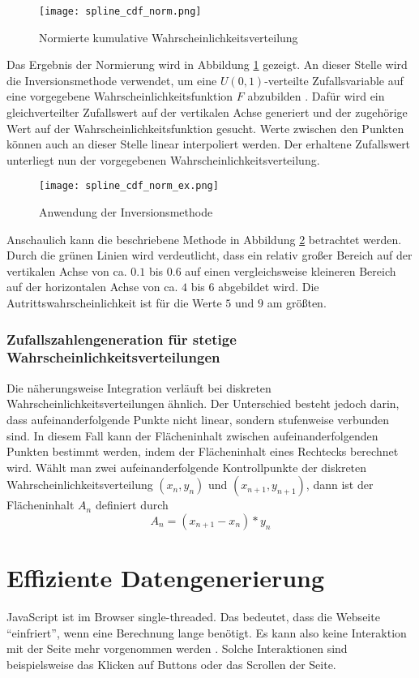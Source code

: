 \begin{figure}[H]
    \centering
    \texttt{[image: spline\_cdf\_norm.png]}
    \caption{Normierte kumulative Wahrscheinlichkeitsverteilung}\label{fig:cdfnorm}
\end{figure}

Das Ergebnis der Normierung wird in Abbildung \ref{fig:cdfnorm} gezeigt.
An dieser Stelle wird die Inversionsmethode verwendet, um eine $U(0,1)$-verteilte Zufallsvariable auf eine vorgegebene Wahrscheinlichkeitsfunktion $F$ abzubilden \cite{Inversionsmethode}. Dafür wird ein gleichverteilter Zufallswert auf der vertikalen Achse generiert und der zugehörige Wert auf der Wahrscheinlichkeitsfunktion gesucht. Werte zwischen den Punkten können auch an dieser Stelle linear interpoliert werden. Der erhaltene Zufallswert unterliegt nun der vorgegebenen Wahrscheinlichkeitsverteilung.

\begin{figure}[H]
    \centering
    \texttt{[image: spline\_cdf\_norm\_ex.png]}
    \caption{Anwendung der Inversionsmethode}\label{fig:cdfnormex}
\end{figure}

Anschaulich kann die beschriebene Methode in Abbildung \ref{fig:cdfnormex} betrachtet werden. Durch die grünen Linien wird verdeutlicht, dass ein relativ großer Bereich auf der vertikalen Achse von ca. $0.1$ bis $0.6$ auf einen vergleichsweise kleineren Bereich auf der horizontalen Achse von ca. $4$ bis $6$ abgebildet wird. Die Autrittswahrscheinlichkeit ist für die Werte $5$ und $9$ am größten.

\subsubsection{Zufallszahlengeneration für stetige Wahrscheinlichkeitsverteilungen}

Die näherungsweise Integration verläuft bei diskreten Wahrscheinlichkeitsverteilungen ähnlich. Der Unterschied besteht jedoch darin, dass aufeinanderfolgende Punkte nicht linear, sondern stufenweise verbunden sind. In diesem Fall kann der Flächeninhalt zwischen aufeinanderfolgenden Punkten bestimmt werden, indem der Flächeninhalt eines Rechtecks berechnet wird.
Wählt man zwei aufeinanderfolgende Kontrollpunkte der diskreten Wahrscheinlichkeitsverteilung $(x_n,y_n)$ und $(x_{n+1},y_{n+1})$, dann ist der Flächeninhalt $A_n$ definiert durch
$$A_n=(x_{n+1}-x_n)*y_n$$

\section{Effiziente Datengenerierung}
JavaScript ist im Browser single-threaded. Das bedeutet, dass die Webseite \enquote{einfriert}, wenn eine Berechnung lange benötigt. Es kann also keine Interaktion mit der Seite mehr vorgenommen werden \cite{googledev:webworkers}. Solche Interaktionen sind beispielsweise das Klicken auf Buttons oder das Scrollen der Seite.

